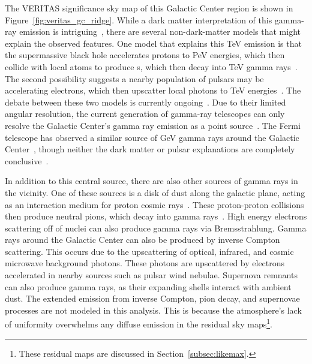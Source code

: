   The VERITAS significance sky map of this Galactic Center region is shown in Figure~\ref{fig:veritas_gc_ridge}.
  While a dark matter interpretation of this gamma-ray emission is intriguing~\cite{hessgcul}, there are several non-dark-matter models that might explain the observed features.
  One model that explains this TeV emission is that the supermassive black hole accelerates protons to PeV energies, which then collide with local atoms to produce \Ppizero{}s, which then decay into TeV gamma rays~\cite{gc_pevatron}.
  The second possibility suggests a nearby population of pulsars may be accelerating electrons, which then upscatter local photons to TeV energies~\cite{HooperTeVMSP}. %
  The debate between these two models is currently ongoing~\cite{gc_pev_or_pwn}.
  Due to their limited angular resolution, the current generation of gamma-ray telescopes can only resolve the Galactic Center's gamma ray emission as a point source~\cite{VeritasGCRidge2015,gc_pointsrc_hess}.
  The Fermi telescope has observed a similar source of GeV gamma rays around the Galactic Center~\cite{gc_fermi_dm}, though neither the dark matter or pulsar explanations are completely conclusive~\cite{fermi_gc_pulsar_vs_dm,hoopergc}.
  
  In addition to this central source, there are also other sources of gamma rays in the vicinity.
  One of these sources is a disk of dust along the galactic plane, acting as an interaction medium for proton cosmic rays~\cite{diffusegamma1989}.
  These proton-proton collisions then produce neutral pions, which decay into gamma rays~\cite{gc_pevatron,Yoast_Hull_2014,hess_gc_diffuse}.
  High energy electrons scattering off of nuclei can also produce gamma rays via Bremsstrahlung.
  Gamma rays around the Galactic Center can also be produced by inverse Compton scattering.
  This occurs due to the upscattering of optical, infrared, and cosmic microwave background photons.
  These photons are upscattered by electrons accelerated in nearby sources such as pulsar wind nebulae.
  Supernova remnants can also produce gamma rays, as their expanding shells interact with ambient dust. 
  The extended emission from inverse Compton, pion decay, and supernovae processes are not modeled in this analysis.
  This is because the atmosphere's lack of uniformity overwhelms any diffuse emission in the residual sky maps\footnote{These residual maps are discussed in Section~\ref{subsec:likemax}.}.


